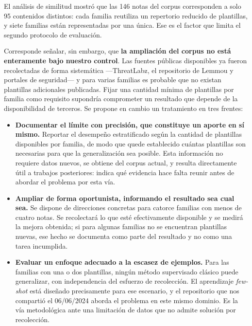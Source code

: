 \documentclass[11pt,a4paper]{article}
\begin{document}
El análisis de similitud mostró que las 146 notas del corpus corresponden a solo 95
contenidos distintos: cada familia reutiliza un repertorio reducido de plantillas, y siete
familias están representadas por una única. Ese es el factor que limita el segundo protocolo
de evaluación.

Corresponde señalar, sin embargo, que \textbf{la ampliación del corpus no está enteramente
bajo nuestro control}. Las fuentes públicas disponibles ya fueron recolectadas de forma
sistemática ---ThreatLabz, el repositorio de Lemmou y portales de seguridad--- y para varias
familias es probable que no existan plantillas adicionales publicadas. Fijar una cantidad
mínima de plantillas por familia como requisito supondría comprometer un resultado que depende
de la disponibilidad de terceros. Se propone en cambio un tratamiento en tres frentes:

\begin{itemize}
\item \textbf{Documentar el límite con precisión, que constituye un aporte en sí mismo.}
Reportar el desempeño estratificado según la cantidad de plantillas disponibles por familia,
de modo que quede establecido cuántas plantillas son necesarias para que la generalización sea
posible. Esta información no requiere datos nuevos, se obtiene del corpus actual, y resulta
directamente útil a trabajos posteriores: indica qué evidencia hace falta reunir antes de
abordar el problema por esta vía.

\item \textbf{Ampliar de forma oportunista, informando el resultado sea cual sea.} Se dispone
de direcciones concretas para catorce familias con menos de cuatro notas. Se recolectará lo
que esté efectivamente disponible y se medirá la mejora obtenida; si para algunas familias no
se encuentran plantillas nuevas, ese hecho se documenta como parte del resultado y no como una
tarea incumplida.

\item \textbf{Evaluar un enfoque adecuado a la escasez de ejemplos.} Para las familias con una
o dos plantillas, ningún método supervisado clásico puede generalizar, con independencia del
esfuerzo de recolección. El aprendizaje \textit{few-shot} está diseñado precisamente para ese
escenario, y el repositorio que nos compartió el 06/06/2024 aborda el problema en este mismo
dominio. Es la vía metodológica ante una limitación de datos que no admite solución por
recolección.
\end{itemize}
\end{document}
